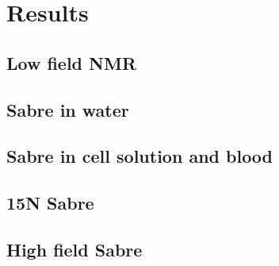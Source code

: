 \chapter{Results}\label{chap:results}
\section{Low field NMR}
\section{Sabre in water}
\section{Sabre in cell solution and blood}
\section{15N Sabre}
\section{High field Sabre}
%

